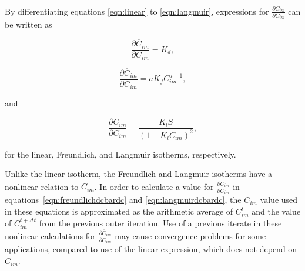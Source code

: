 By differentiating equations \ref{eqn:linear} to \ref{eqn:langmuir}, expressions for $\frac{\partial \overline{C}_{im}}{\partial C_{im}}$ can be written as

\begin{equation}
\label{eqn:lineardcbardc}
\frac{\partial \overline{C}_{im}}{\partial C_{im}} = K_d,
\end{equation}

\begin{equation}
\label{eqn:freundlichdcbardc}
\frac{\partial \overline{C}_{im}}{\partial C_{im}} = a K_f C_{im}^{a - 1},
\end{equation}

\noindent and

\begin{equation}
\label{eqn:langmuirdcbardc}
\frac{\partial \overline{C}_{im}}{\partial C_{im}} = \frac{K_l \overline{S}}{\left ( 1 + K_l C_{im} \right )^2},
\end{equation}

\noindent for the linear, Freundlich, and Langmuir isotherms, respectively.  

Unlike the linear isotherm, the Freundlich and Langmuir isotherms have a nonlinear relation to $C_{im}$.  In order to calculate a value for $\frac{\partial \overline{C}_{im}}{\partial C_{im}}$ in equations~\ref{eqn:freundlichdcbardc} and \ref{eqn:langmuirdcbardc}, the $C_{im}$ value used in these equations is approximated as the arithmetic average of $C_{im}^{t}$ and the value of $C_{im}^{t + \Delta t}$ from the previous outer iteration.  Use of a previous iterate in these nonlinear calculations for $\frac{\partial \overline{C}_{im}}{\partial C_{im}}$ may cause convergence problems for some applications, compared to use of the linear expression, which does not depend on $C_{im}$.  